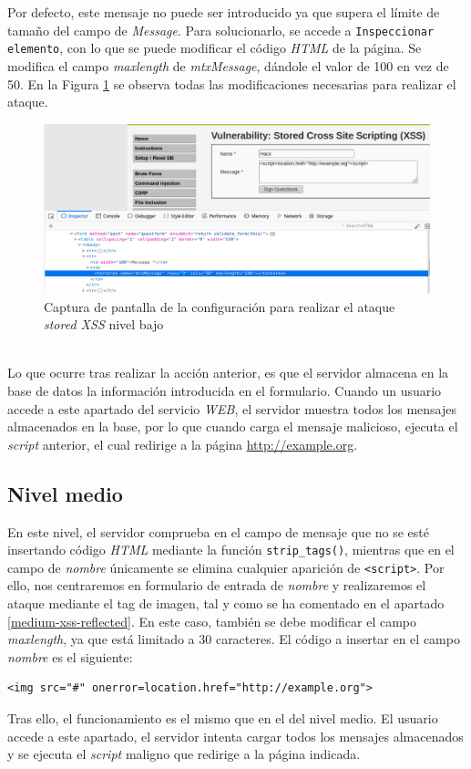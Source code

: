 \documentclass{article}
\begin{document}
Por defecto, este mensaje no puede ser introducido ya que supera el límite de tamaño del campo de \textit{Message}. Para solucionarlo, se accede a \texttt{Inspeccionar elemento}, con lo que se puede modificar el código \textit{HTML} de la página. Se modifica el campo \textit{maxlength} de \textit{mtxMessage}, dándole el valor de 100 en vez de 50. En la Figura \ref{fig:xss_stored_low} se observa todas las modificaciones necesarias para realizar el ataque. \\
\begin{figure}[h!]
    \centering
    \includegraphics[scale=0.6]{images/xss_stored_low.png}
    \caption{Captura de pantalla de la configuración para realizar el ataque \textit{stored XSS} nivel bajo}
    \label{fig:xss_stored_low}
\end{figure}
\\
Lo que ocurre tras realizar la acción anterior, es que el servidor almacena en la base de datos la información introducida en el formulario. Cuando un usuario accede a este apartado del servicio \textit{WEB}, el servidor muestra todos los mensajes almacenados en la base, por lo que cuando carga el mensaje malicioso, ejecuta el \textit{script} anterior, el cual redirige a la página \url{http://example.org}.
\newpage

\subsection{Nivel medio}

En este nivel, el servidor comprueba en el campo de mensaje que no se esté insertando código \textit{HTML} mediante la función \texttt{strip\_tags()}, mientras que en el campo de \textit{nombre} únicamente se elimina cualquier aparición de \texttt{<script>}. Por ello, nos centraremos en formulario de entrada de \textit{nombre} y realizaremos el ataque mediante el tag de imagen, tal y como se ha comentado en el apartado \ref{medium-xss-reflected}. En este caso, también se debe modificar el campo \textit{maxlength}, ya que está limitado a 30 caracteres. El código a insertar en el campo \textit{nombre} es el siguiente:

\begin{lstlisting}
<img src="#" onerror=location.href="http://example.org">
\end{lstlisting}

Tras ello, el funcionamiento es el mismo que en el del nivel medio. El usuario accede a este apartado, el servidor intenta cargar todos los mensajes almacenados y se ejecuta el \textit{script} maligno que redirige a la página indicada.
\end{document}
